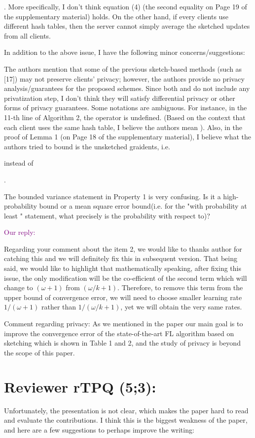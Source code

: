 \documentclass{article}
\begin{document}
. More specifically, I don't think equation (4) (the second equality on Page 19 of the supplementary material) holds. On the other hand, if every clients use different hash tables, then the server cannot simply average the sketched updates from all clients.

In addition to the above issue, I have the following minor concerns/suggestions:

The authors mention that some of the previous sketch-based methods (such as [17]) may not preserve clients' privacy; however, the authors provide no privacy analysis/guarantees for the proposed schemes. Since both  and  do not include any privatization step, I don't think they will satisfy differential privacy or other forms of privacy guarantees.
Some notations are ambiguous. For instance, in the 11-th line of Algorithm 2, the 
 operator is undefined. (Based on the context that each client uses the same hash table, I believe the authors mean 
). Also, in the proof of Lemma 1 (on Page 18 of the supplementary material), I believe what the authors tried to bound is the unsketched graidents, i.e. 
 
 instead of 
 
.

The bounded variance statement in Property 1 is very confusing. Is it a high-probability bound or a mean square error bound(i.e. for the "with probability at least " statement, what precisely is the probability with respect to)?

\textcolor{purple}{Our reply:}

{\color{blue} Regarding your comment about the item 2, we would like to thanks author for catching this and we will definitely fix this in subsequent version. That being said, we would like to highlight that mathematically speaking, after fixing this issue, the only modification will be the co-efficient of the second term which will change to $(\omega+1)$ from $(\omega/k+1)$. Therefore, to remove this term from the upper bound of convergence error, we will need to choose smaller learning rate $1/(\omega+1)$ rather than $1/(\omega/k+1)$, yet we will obtain the very same rates.    


Comment regarding privacy: As we mentioned in the paper our main goal is to improve the convergence error of the state-of-the-art FL algorithm based on sketching which is shown in Table 1 and 2, and the study of privacy is beyond the scope of this paper. }

\section{Reviewer rTPQ (5;3):}
Unfortunately, the presentation is not clear, which makes the paper hard to read and evaluate the contributions. I think this is the biggest weakness of the paper, and here are a few suggestions to perhaps improve the writing:
\end{document}

